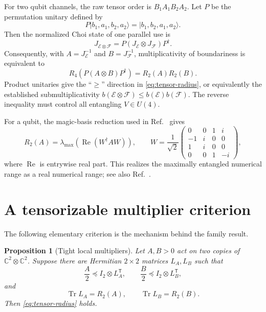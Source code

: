 \documentclass[11pt,a4paper]{article}
\newtheorem{proposition}[theorem]{Proposition}
\theoremstyle{remark}
\DeclareMathOperator{\Tr}{Tr}
\DeclareMathOperator{\Ree}{Re}
\newcommand{\cE}{\mathcal E}
\newcommand{\cF}{\mathcal F}
\newcommand{\I}{I}
\begin{document}
For two qubit channels, the raw tensor order is $B_1A_1B_2A_2$.  Let $P$
be the permutation unitary defined by
\begin{equation}
 P|b_1,a_1,b_2,a_2\rangle=|b_1,b_2,a_1,a_2\rangle.
 \label{eq:permutation}
\end{equation}
Then the normalized Choi state of one parallel use is
\begin{equation}
 J_{\cE\otimes\cF}=P(J_{\cE}\otimes J_{\cF})P^\dagger.
 \label{eq:product-choi}
\end{equation}
Consequently, with $A=J_{\cE}^{-1}$ and $B=J_{\cF}^{-1}$, multiplicativity
of boundariness is equivalent to
\begin{equation}
 R_4\!\left(P(A\otimes B)P^\dagger\right)=R_2(A)R_2(B).
 \label{eq:tensor-radius}
\end{equation}
Product unitaries give the ``$\geq$'' direction in \eqref{eq:tensor-radius},
or equivalently the established submultiplicativity
$b(\cE\otimes\cF)\leq b(\cE)b(\cF)$.  The reverse inequality must control
all entangling $V\in U(4)$.

For a qubit, the magic-basis reduction used in
Ref.~\cite{Puchala2015} gives
\begin{equation}
 R_2(A)=\lambda_{\max}\!\left(\Ree(W^\dagger A W)\right),
 \qquad
 W=\frac{1}{\sqrt2}
 \begin{pmatrix}
 0&0&1&i\\
 -1&i&0&0\\
 1&i&0&0\\
 0&0&1&-i
 \end{pmatrix},
 \label{eq:magic}
\end{equation}
where $\Ree$ is entrywise real part.  This realizes the maximally entangled
numerical range as a real numerical range; see also
Ref.~\cite{Dunkl2015}.

\section{A tensorizable multiplier criterion}
\label{sec:criterion}

The following elementary criterion is the mechanism behind the family result.

\begin{proposition}[Tight local multipliers]
\label{prop:multiplier}
Let $A,B>0$ act on two copies of $\mathbb C^2\otimes\mathbb C^2$.
Suppose there are Hermitian $2\times2$ matrices $L_A,L_B$ such that
\begin{equation}
 \frac{A}{2}\preceq \I_2\otimes L_A^{\mathsf T},\qquad
 \frac{B}{2}\preceq \I_2\otimes L_B^{\mathsf T},
 \label{eq:local-ceilings}
\end{equation}
and
\begin{equation}
 \Tr L_A=R_2(A),\qquad \Tr L_B=R_2(B).
 \label{eq:tight-traces}
\end{equation}
Then \eqref{eq:tensor-radius} holds.
\end{proposition}
\end{document}
